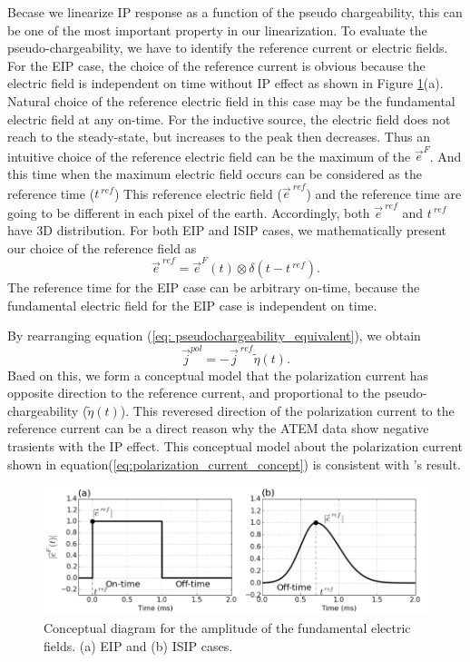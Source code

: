 \documentclass[a4paper, 11pt]{article}
\renewcommand {\j}  { {\vec j} }
\newcommand {\e}  { {\vec e} }
\newcommand{\peta}{\tilde{\eta}}
\newcommand{\eref}{\e^{\ ref}}
\newcommand{\jref}{\j^{\ ref}}
\begin{document}
Becase we linearize IP response as a function of the pseudo chargeability, this can be one of the most important property in our linearization. 
To evaluate the pseudo-chargeability, we have to identify the reference current or electric fields. 
For the EIP case, the choice of the reference current is obvious because the electric field is independent on time without IP effect as shown in Figure \ref{F:DCEM_F_current}(a). 
Natural choice of the reference electric field in this case may be the fundamental electric field at any on-time. 
For the inductive source, the electric field does not reach to the steady-state, but increases to the peak then decreases. 
Thus an intuitive choice of the reference electric field can be the maximum of the $\e^{F}$. 
And this time when the maximum electric field occurs can be considered as the reference time ($t^{\ ref}$)
This reference electric field ($\eref$) and the reference time are going to be different in each pixel of the earth. 
Accordingly, both $\eref$ and $t^{\ ref}$ have 3D distribution. 
For both EIP and ISIP cases, we mathematically present our choice of the reference field as
\begin{equation}
  \eref = \e^{F}(t) \otimes \delta(t-t^{\ ref}). 
  \label{eq:reference_electricfield}
\end{equation}
The reference time for the EIP case can be arbitrary on-time, because the fundamental electric field for the EIP case is independent on time. 

By rearranging equation (\ref{eq: pseudochargeability_equivalent}), we obtain 
\begin{equation}
  \j^{pol} = -\jref\peta(t). 
  \label{eq:polarization_current_concept}
\end{equation}
Baed on this, we form a conceptual model that the polarization current has opposite direction to the reference current, and proportional to the pseudo-chargeability ($\peta(t)$). 
This reveresed direction of the polarization current to the reference current can be a direct reason why the ATEM data show negative trasients with the IP effect. 
This conceptual model about the polarization current shown in equation(\ref{eq:polarization_current_concept}) is consistent with \cite{seigel1959}'s result. 
\begin{figure}
  \centering  
  \includegraphics[width=1.0\textwidth]{figures/DCEM_F_current.png}
  \caption{Conceptual diagram for the amplitude of the fundamental electric fields. (a) EIP and (b) ISIP cases.}
  \label{F:DCEM_F_current}
\end{figure}
  
\end{document}
